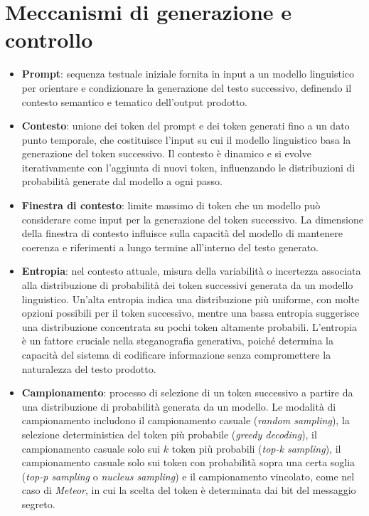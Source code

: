 \section{Meccanismi di generazione e controllo}
\begin{itemize}
	\item \textbf{Prompt}: sequenza testuale iniziale fornita in input a un modello linguistico per orientare e condizionare la generazione del testo successivo, definendo il contesto semantico e tematico dell'output prodotto.
	\item \textbf{Contesto}: unione dei token del prompt e dei token generati fino a un dato punto temporale, che costituisce l'input su cui il modello linguistico basa la generazione del token successivo. Il contesto è dinamico e si evolve iterativamente con l'aggiunta di nuovi token, influenzando le distribuzioni di probabilità generate dal modello a ogni passo.
	\item \textbf{Finestra di contesto}: limite massimo di token che un modello può considerare come input per la generazione del token successivo. La dimensione della finestra di contesto influisce sulla capacità del modello di mantenere coerenza e riferimenti a lungo termine all'interno del testo generato. 
	\item \textbf{Entropia}: nel contesto attuale, misura della variabilità o incertezza associata alla distribuzione di probabilità dei token successivi generata da un modello linguistico. Un'alta entropia indica una distribuzione pi\`u uniforme, con molte opzioni possibili per il token successivo, mentre una bassa entropia suggerisce una distribuzione concentrata su pochi token altamente probabili. L'entropia è un fattore cruciale nella steganografia generativa, poiché determina la capacità del sistema di codificare informazione senza compromettere la naturalezza del testo prodotto.
	\item \textbf{Campionamento}: processo di selezione di un token successivo a partire da una distribuzione di probabilità generata da un modello. Le modalità di campionamento includono il campionamento casuale (\emph{random sampling}), la selezione deterministica del token più probabile (\emph{greedy decoding}), il campionamento casuale solo sui $k$ token più probabili (\emph{top-k sampling}), il campionamento casuale solo sui token con probabilità sopra una certa soglia (\emph{top-p sampling} o \emph{nucleus sampling}) e il campionamento vincolato, come nel caso di \emph{Meteor}, in cui la scelta del token è determinata dai bit del messaggio segreto.
\end{itemize}


